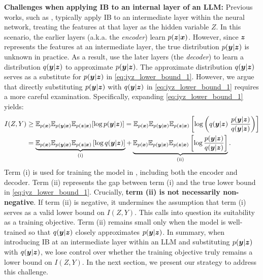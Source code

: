 \textbf{Challenges when applying IB to an internal layer of an LLM:} Previous works, such as \citet{alemi2017deep}, typically apply IB to an intermediate layer within the neural network, treating the features at that layer as the hidden variable $Z$. In this scenario, the earlier layers (a.k.a. the \emph{encoder}) learn $p(\bm{z} | \bm{x})$. However, since $\bm{z}$ represents the features at an intermediate layer, the true distribution $p(\bm{y} | \bm{z})$ is unknown in practice. As a result, \citet{alemi2017deep} use the later layers (the \emph{decoder}) to learn a distribution $q(\bm{y} | \bm{z})$ to approximate $p(\bm{y} | \bm{z})$. The approximate distribution $q(\bm{y} | \bm{z})$ serves as a substitute for $p(\bm{y} | \bm{z})$ in \cref{eq:iyz_lower_bound_1}. However, we argue that directly substituting $p(\bm{y} | \bm{z})$ with $q(\bm{y} | \bm{z})$ in \cref{eq:iyz_lower_bound_1} requires a more careful examination. Specifically, 
expanding \cref{eq:iyz_lower_bound_1} yields:
\begin{equation}
    \begin{aligned}
        I(Z,Y) &\geq \mathbb{E}_{p(\bm{x})} \mathbb{E}_{p(\bm{y}|\bm{x})} \mathbb{E}_{p(\bm{z} | \bm{x})}[\log p(\bm{y} |\bm{z})] 
        =  \mathbb{E}_{p(\bm{x})} \mathbb{E}_{p(\bm{y}|\bm{x})} \mathbb{E}_{p(\bm{z} | \bm{x})}\left[\log 
        \left( q(\bm{y} |\bm{z}) \ \frac{p(\bm{y} | \bm{z})}{q(\bm{y} | \bm{z})} \right)\right] \\
        &= \underbrace{\mathbb{E}_{p(\bm{x})} \mathbb{E}_{p(\bm{y}|\bm{x})} \mathbb{E}_{p(\bm{z} | \bm{x})}\left[\log q(\bm{y} |\bm{z}) \right]}_{\text{(i)}} + \underbrace{\mathbb{E}_{p(\bm{x})} \mathbb{E}_{p(\bm{y}|\bm{x})} \mathbb{E}_{p(\bm{z} | \bm{x})} \left[ \log \frac{p(\bm{y} | \bm{z})}{q(\bm{y} | \bm{z})} \right]}_{\text{(ii)}}. \\
    \end{aligned}
\end{equation}
Term (i) is used for training the model in \citet{alemi2017deep}, including both the encoder and decoder. Term (ii) represents the gap between term (i) and the true lower bound in \cref{eq:iyz_lower_bound_1}. Crucially, \textbf{term (ii) is not necessarily non-negative}. If term (ii) is negative, it undermines the assumption that term (i) serves as a valid lower bound on $I(Z, Y)$. This calls into question its suitability as a training objective. Term (ii) remains small only when the model is well-trained so that $q(\bm{y}|\bm{z})$ closely approximates $p(\bm{y}|\bm{z})$. In summary, when introducing IB at an intermediate layer within an LLM and substituting $p(\bm{y} | \bm{z})$ with $q(\bm{y} | \bm{z})$, we lose control over whether the training objective truly remains a lower bound on $I(Z, Y)$. In the next section, we present our strategy to address this challenge.

